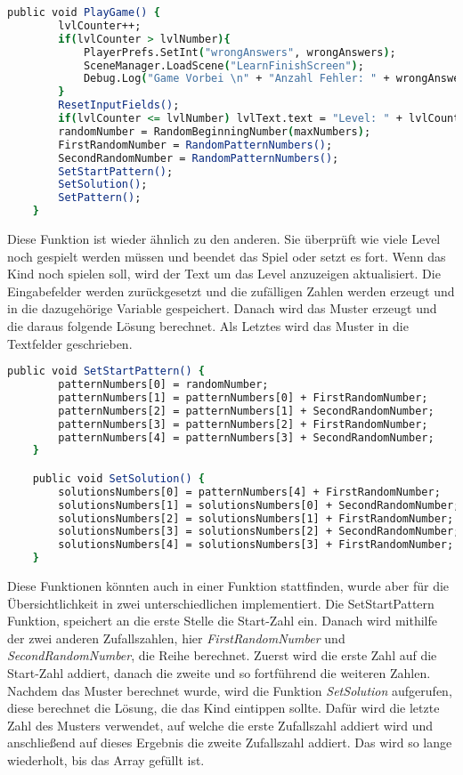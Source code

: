 \begin{lstlisting}[language=csh, caption={hideCircle.cs PlayGame-Funktion}]
	public void PlayGame() {
		lvlCounter++;
		if(lvlCounter > lvlNumber){
			PlayerPrefs.SetInt("wrongAnswers", wrongAnswers);
			SceneManager.LoadScene("LearnFinishScreen");
			Debug.Log("Game Vorbei \n" + "Anzahl Fehler: " + wrongAnswers);
		}
		ResetInputFields();
		if(lvlCounter <= lvlNumber)	lvlText.text = "Level: " + lvlCounter + "/" + lvlNumber;;
		randomNumber = RandomBeginningNumber(maxNumbers);
		FirstRandomNumber = RandomPatternNumbers();
		SecondRandomNumber = RandomPatternNumbers();
		SetStartPattern();
		SetSolution();
		SetPattern();
	}
\end{lstlisting}
Diese Funktion ist wieder ähnlich zu den anderen. Sie überprüft wie viele Level noch gespielt werden müssen und beendet das Spiel oder setzt es fort. Wenn das Kind noch spielen soll, wird der Text um das Level anzuzeigen aktualisiert. Die Eingabefelder werden zurückgesetzt und die zufälligen Zahlen werden erzeugt und in die dazugehörige Variable gespeichert. Danach wird das Muster erzeugt und die daraus folgende Lösung berechnet. Als Letztes wird das Muster in die Textfelder geschrieben.\\
\begin{lstlisting}[language=csh, caption={hideCircle.cs SetStartPattern- und SetSolution-Funktion}]
	public void SetStartPattern() {
		patternNumbers[0] = randomNumber;
		patternNumbers[1] = patternNumbers[0] + FirstRandomNumber;
		patternNumbers[2] = patternNumbers[1] + SecondRandomNumber;
		patternNumbers[3] = patternNumbers[2] + FirstRandomNumber;
		patternNumbers[4] = patternNumbers[3] + SecondRandomNumber;
	}

	public void SetSolution() {
		solutionsNumbers[0] = patternNumbers[4] + FirstRandomNumber;
		solutionsNumbers[1] = solutionsNumbers[0] + SecondRandomNumber;
		solutionsNumbers[2] = solutionsNumbers[1] + FirstRandomNumber;
		solutionsNumbers[3] = solutionsNumbers[2] + SecondRandomNumber;
		solutionsNumbers[4] = solutionsNumbers[3] + FirstRandomNumber;
	}
\end{lstlisting}
Diese Funktionen könnten auch in einer Funktion stattfinden, wurde aber für die Übersichtlichkeit in zwei unterschiedlichen implementiert. Die SetStartPattern Funktion, speichert an die erste Stelle die Start-Zahl ein. Danach wird mithilfe der zwei anderen Zufallszahlen, hier \textit{FirstRandomNumber} und \textit{SecondRandomNumber}, die Reihe berechnet. Zuerst wird die erste Zahl auf die Start-Zahl addiert, danach die zweite und so fortführend die weiteren Zahlen. Nachdem das Muster berechnet wurde, wird die Funktion \textit{SetSolution} aufgerufen, diese berechnet die Lösung, die das Kind eintippen sollte. Dafür wird die letzte Zahl des Musters verwendet, auf welche die erste Zufallszahl addiert wird und anschließend auf dieses Ergebnis die zweite Zufallszahl addiert. Das wird so lange wiederholt, bis das Array gefüllt ist.\\
